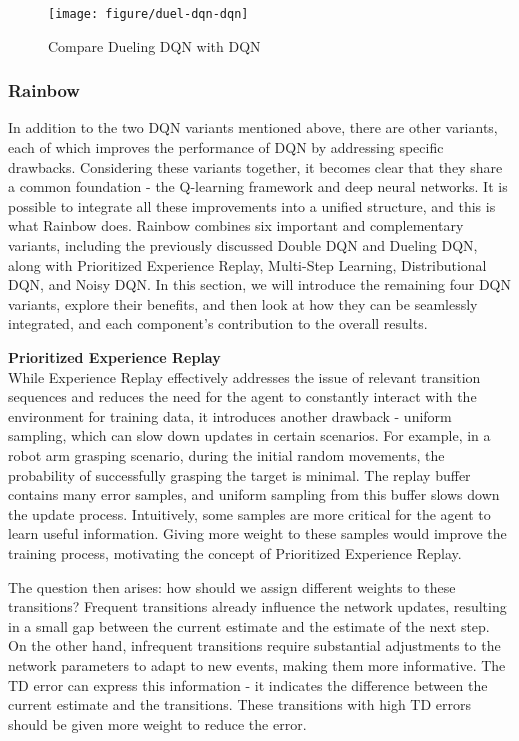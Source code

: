 \documentclass{article}
\begin{document}
\begin{figure}[htbp]
        \centering
        \texttt{[image: figure/duel-dqn-dqn]}
        \caption{Compare Dueling DQN with DQN}
\end{figure}


\newpage
\subsubsection{Rainbow}

In addition to the two DQN variants mentioned above, there are other variants, each of which improves the performance of DQN by addressing specific drawbacks. Considering these variants together, it becomes clear that they share a common foundation - the Q-learning framework and deep neural networks. It is possible to integrate all these improvements into a unified structure, and this is what Rainbow does. Rainbow combines six important and complementary variants, including the previously discussed Double DQN and Dueling DQN, along with Prioritized Experience Replay, Multi-Step Learning, Distributional DQN, and Noisy DQN. In this section, we will introduce the remaining four DQN variants, explore their benefits, and then look at how they can be seamlessly integrated, and each component's contribution to the overall results.

\hspace*{\fill}

\noindent
\textbf{Prioritized Experience Replay}\\
\noindent
While Experience Replay effectively addresses the issue of relevant transition sequences and reduces the need for the agent to constantly interact with the environment for training data, it introduces another drawback - uniform sampling, which can slow down updates in certain scenarios. For example, in a robot arm grasping scenario, during the initial random movements, the probability of successfully grasping the target is minimal. The replay buffer contains many error samples, and uniform sampling from this buffer slows down the update process. Intuitively, some samples are more critical for the agent to learn useful information. Giving more weight to these samples would improve the training process, motivating the concept of Prioritized Experience Replay.

The question then arises: how should we assign different weights to these transitions? Frequent transitions already influence the network updates, resulting in a small gap between the current estimate and the estimate of the next step. On the other hand, infrequent transitions require substantial adjustments to the network parameters to adapt to new events, making them more informative. The TD error can express this information - it indicates the difference between the current estimate and the transitions. These transitions with high TD errors should be given more weight to reduce the error.
\end{document}
